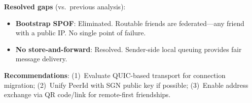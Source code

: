 \documentclass[11pt,a4paper]{article}
\begin{document}
\textbf{Resolved gaps} (vs.\ previous analysis):
\begin{itemize}[nosep]
  \item \textbf{Bootstrap SPOF}: Eliminated. Routable friends are federated---any friend with a public IP. No single point of failure.
  \item \textbf{No store-and-forward}: Resolved. Sender-side local queuing provides fair message delivery.
\end{itemize}

\textbf{Recommendations}: (1)~Evaluate QUIC-based transport for connection migration; (2)~Unify PeerId with SGN public key if possible; (3)~Enable address exchange via QR code/link for remote-first friendships.
\end{document}
